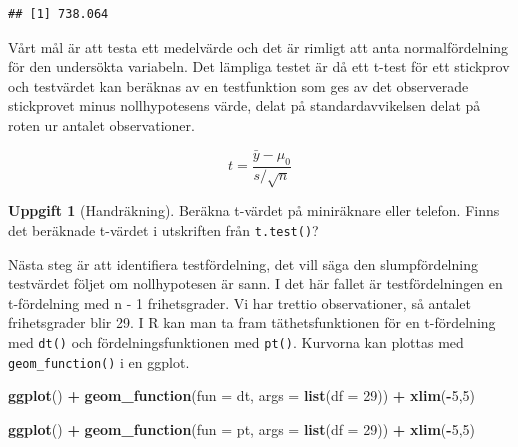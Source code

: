 \documentclass[
]{book}
\newenvironment{Shaded}{\begin{snugshade}}{\end{snugshade}}
\newcommand{\AttributeTok}[1]{\textcolor[rgb]{0.13,0.29,0.53}{#1}}
\newcommand{\DecValTok}[1]{\textcolor[rgb]{0.00,0.00,0.81}{#1}}
\newcommand{\FunctionTok}[1]{\textcolor[rgb]{0.13,0.29,0.53}{\textbf{#1}}}
\newcommand{\NormalTok}[1]{#1}
\newcommand{\SpecialCharTok}[1]{\textcolor[rgb]{0.81,0.36,0.00}{\textbf{#1}}}
\theoremstyle{definition}
\theoremstyle{definition}
\theoremstyle{definition}
\newtheorem{exercise}{Uppgift}[chapter]
\theoremstyle{definition}
\theoremstyle{remark}
\begin{document}
\begin{Shaded}
\end{Shaded}

\begin{verbatim}
## [1] 738.064
\end{verbatim}

Vårt mål är att testa ett medelvärde och det är rimligt att anta normalfördelning för den undersökta variabeln. Det lämpliga testet är då ett t-test för ett stickprov och testvärdet kan beräknas av en testfunktion som ges av det observerade stickprovet minus nollhypotesens värde, delat på standardavvikelsen delat på roten ur antalet observationer.

\[t = \frac{\bar{y} - \mu_0}{s/\sqrt{n}}\]

\begin{exercise}[Handräkning]
Beräkna t-värdet på miniräknare eller telefon. Finns det beräknade t-värdet i utskriften från \texttt{t.test()}?
\end{exercise}

Nästa steg är att identifiera testfördelning, det vill säga den slumpfördelning testvärdet följet om nollhypotesen är sann. I det här fallet är testfördelningen en t-fördelning med n - 1 frihetsgrader. Vi har trettio observationer, så antalet frihetsgrader blir 29. I R kan man ta fram täthetsfunktionen för en t-fördelning med \texttt{dt()} och fördelningsfunktionen med \texttt{pt()}. Kurvorna kan plottas med \texttt{geom\_function()} i en ggplot.

\begin{Shaded}
\begin{Highlighting}[]
\FunctionTok{ggplot}\NormalTok{() }\SpecialCharTok{+}
  \FunctionTok{geom\_function}\NormalTok{(}\AttributeTok{fun =}\NormalTok{ dt, }\AttributeTok{args =} \FunctionTok{list}\NormalTok{(}\AttributeTok{df =} \DecValTok{29}\NormalTok{)) }\SpecialCharTok{+}
  \FunctionTok{xlim}\NormalTok{(}\SpecialCharTok{{-}}\DecValTok{5}\NormalTok{,}\DecValTok{5}\NormalTok{)}
\end{Highlighting}
\end{Shaded}

\begin{Shaded}
\begin{Highlighting}[]
\FunctionTok{ggplot}\NormalTok{() }\SpecialCharTok{+}
  \FunctionTok{geom\_function}\NormalTok{(}\AttributeTok{fun =}\NormalTok{ pt, }\AttributeTok{args =} \FunctionTok{list}\NormalTok{(}\AttributeTok{df =} \DecValTok{29}\NormalTok{)) }\SpecialCharTok{+}
  \FunctionTok{xlim}\NormalTok{(}\SpecialCharTok{{-}}\DecValTok{5}\NormalTok{,}\DecValTok{5}\NormalTok{)}
\end{Highlighting}
\end{Shaded}
\end{document}
